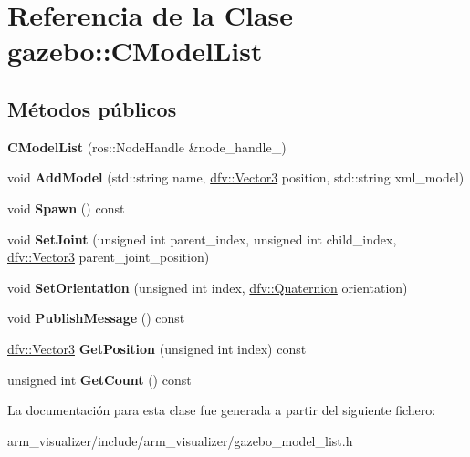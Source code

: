 \hypertarget{classgazebo_1_1CModelList}{\section{\-Referencia de la \-Clase gazebo\-:\-:\-C\-Model\-List}
\label{classgazebo_1_1CModelList}
}
\subsection*{\-Métodos públicos}
\begin{DoxyCompactItemize}
\item 
\hypertarget{classgazebo_1_1CModelList_a8344c89c992c4514dd075c50d86f97dc}{{\bfseries \-C\-Model\-List} (ros\-::\-Node\-Handle \&node\-\_\-handle\-\_\-)}\label{classgazebo_1_1CModelList_a8344c89c992c4514dd075c50d86f97dc}

\item 
\hypertarget{classgazebo_1_1CModelList_ae11e5eaab1a5225ef58280142be37531}{void {\bfseries \-Add\-Model} (std\-::string name, \hyperlink{classdfv_1_1Vector3}{dfv\-::\-Vector3} position, std\-::string xml\-\_\-model)}\label{classgazebo_1_1CModelList_ae11e5eaab1a5225ef58280142be37531}

\item 
\hypertarget{classgazebo_1_1CModelList_a8a73dce35555c323b265e15ff0181b89}{void {\bfseries \-Spawn} () const }\label{classgazebo_1_1CModelList_a8a73dce35555c323b265e15ff0181b89}

\item 
\hypertarget{classgazebo_1_1CModelList_a32381127150a740ceec7761ed02926a5}{void {\bfseries \-Set\-Joint} (unsigned int parent\-\_\-index, unsigned int child\-\_\-index, \hyperlink{classdfv_1_1Vector3}{dfv\-::\-Vector3} parent\-\_\-joint\-\_\-position)}\label{classgazebo_1_1CModelList_a32381127150a740ceec7761ed02926a5}

\item 
\hypertarget{classgazebo_1_1CModelList_a2c65c0ed80412544f82499c0d46d3d5f}{void {\bfseries \-Set\-Orientation} (unsigned int index, \hyperlink{classdfv_1_1Quaternion}{dfv\-::\-Quaternion} orientation)}\label{classgazebo_1_1CModelList_a2c65c0ed80412544f82499c0d46d3d5f}

\item 
\hypertarget{classgazebo_1_1CModelList_abe7f4efcc6af34e4683b0aa3df5518fa}{void {\bfseries \-Publish\-Message} () const }\label{classgazebo_1_1CModelList_abe7f4efcc6af34e4683b0aa3df5518fa}

\item 
\hypertarget{classgazebo_1_1CModelList_a2376cfc29058cfd1c2b8217bffb7319f}{\hyperlink{classdfv_1_1Vector3}{dfv\-::\-Vector3} {\bfseries \-Get\-Position} (unsigned int index) const }\label{classgazebo_1_1CModelList_a2376cfc29058cfd1c2b8217bffb7319f}

\item 
\hypertarget{classgazebo_1_1CModelList_ae2c3c59e7fbbfa92f42cebe27b0a65d0}{unsigned int {\bfseries \-Get\-Count} () const }\label{classgazebo_1_1CModelList_ae2c3c59e7fbbfa92f42cebe27b0a65d0}

\end{DoxyCompactItemize}


\-La documentación para esta clase fue generada a partir del siguiente fichero\-:\begin{DoxyCompactItemize}
\item 
arm\-\_\-visualizer/include/arm\-\_\-visualizer/gazebo\-\_\-model\-\_\-list.\-h\end{DoxyCompactItemize}
